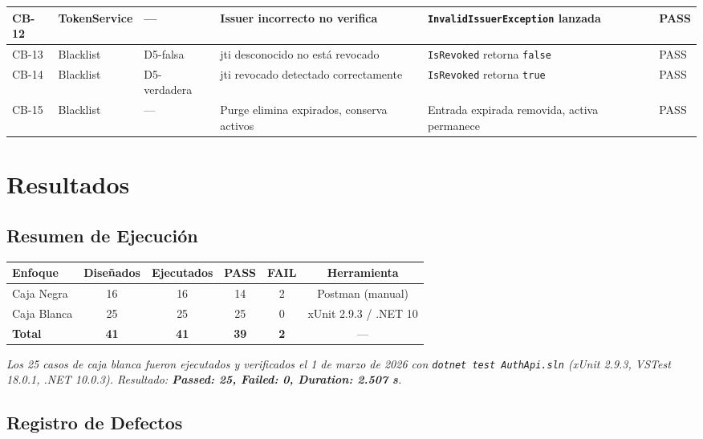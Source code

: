 \documentclass[11pt,a4paper]{article}
\begin{document}
\begin{longtable}{|p{0.9cm}|p{2.4cm}|p{2cm}|p{4cm}|p{3.6cm}|p{1.1cm}|}
\hline
\rowcolor{rowgray}
CB-12 & TokenService & — & Issuer incorrecto no verifica & \texttt{InvalidIssuerException} lanzada & PASS \\
\hline
CB-13 & Blacklist & D5-falsa & jti desconocido no está revocado & \texttt{IsRevoked} retorna \texttt{false} & PASS \\
\hline
\rowcolor{rowgray}
CB-14 & Blacklist & D5-verdadera & jti revocado detectado correctamente & \texttt{IsRevoked} retorna \texttt{true} & PASS \\
\hline
CB-15 & Blacklist & — & Purge elimina expirados, conserva activos & Entrada expirada removida, activa permanece & PASS \\
\hline
\end{longtable}

\section{Resultados}

\subsection{Resumen de Ejecución}

\begin{center}
\renewcommand{\arraystretch}{1.4}
\begin{tabular}{|l|c|c|c|c|c|}
\hline
\rowcolor{headerblue}
\color{white}\textbf{Enfoque} & \color{white}\textbf{Diseñados} & \color{white}\textbf{Ejecutados} & \color{white}\textbf{PASS} & \color{white}\textbf{FAIL} & \color{white}\textbf{Herramienta} \\
\hline
Caja Negra  & 16 & 16 & 14 & 2 & Postman (manual) \\
\hline
\rowcolor{rowgray}
Caja Blanca & 25 & 25 & 25 & 0 & xUnit 2.9.3 / .NET 10 \\
\hline
\textbf{Total} & \textbf{41} & \textbf{41} & \textbf{39} & \textbf{2} & — \\
\hline
\end{tabular}
\end{center}

\noindent\textit{Los 25 casos de caja blanca fueron ejecutados y verificados el 1 de marzo de 2026 con \texttt{dotnet test AuthApi.sln} (xUnit 2.9.3, VSTest 18.0.1, .NET 10.0.3). Resultado: \textbf{Passed: 25, Failed: 0, Duration: 2.507 s}.}

\subsection{Registro de Defectos}
\end{document}
